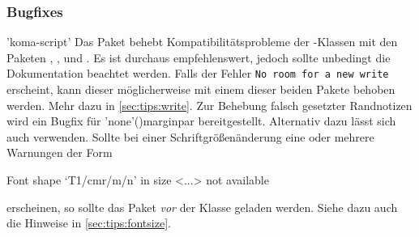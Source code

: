 \subsubsection{Bugfixes}

\begin{DeclarePackages}
'koma-script'
  Das Paket behebt Kompatibilitätsprobleme der \KOMAScript-Klassen mit den 
  Paketen , ,  und
  . Es ist durchaus empfehlenswert, jedoch sollte unbedingt 
  die Dokumentation beachtet werden.
  Falls der Fehler \texttt{No room for a new \bsc write} erscheint, 
  kann dieser möglicherweise mit einem dieser beiden Pakete behoben werden. 
  Mehr dazu in \autoref{sec:tips:write}.
  Zur Behebung falsch gesetzter Randnotizen wird ein Bugfix für 
  \Macro'none'(){marginpar} bereitgestellt. Alternativ 
  dazu lässt sich auch  verwenden.
  Sollte bei einer Schriftgrößenänderung eine oder mehrere Warnungen der Form
  \begin{Code}
    Font shape `T1/cmr/m/n' in size <...> not available
  \end{Code}\vspace{-\baselineskip}%
  erscheinen, so sollte das Paket  \emph{vor} der Klasse 
  geladen werden. Siehe dazu auch die Hinweise in \autoref{sec:tips:fontsize}.%
\end{DeclarePackages}
%
